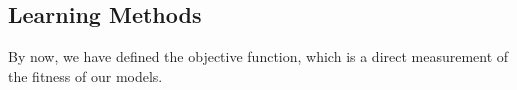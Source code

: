 \subsection {Learning Methods}
By now, we have defined the objective function, which is a direct measurement of the fitness of our models. 